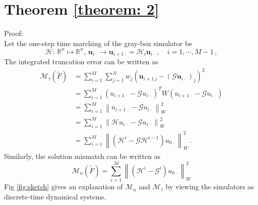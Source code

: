 \section{Theorem \ref{theorem: 2}}
\label{proof 2}
Proof: \\
Let the one-step time marching of the gray-box simulator be
\begin{equation*}
    \mathcal{H}:\, \mathbb{R}^n\mapsto\mathbb{R}^n,\, 
    \boldsymbol{u}_{i\cdot}
    \rightarrow 
    \boldsymbol{u}_{i+1\cdot} = \mathcal{H}_i\boldsymbol{u}_{i\cdot} \,,
    \quad i=1,\cdots, M-1\,,
\end{equation*}
The integrated truncation error can be written as
\begin{equation*}\begin{split}
    \mathcal{M}_{\tau}(\tilde{F}) &= 
        \sum_{i=1}^M \sum_{j=1}^N w_{j} \left(
        \boldsymbol{u}_{i+1\, j} - (\mathcal{G}\boldsymbol{u}_{i\, \cdot})_j
        \right)^2\\
    &= \sum_{i=1}^M (u_{i+1\,\cdot} - \mathcal{G} u_{i\,\cdot})^T W
                    (u_{i+1\,\cdot} - \mathcal{G} u_{i\,\cdot}) \\
    &= \sum_{i=1}^M \left\|u_{i+1\,\cdot} - \mathcal{G} u_{i\,\cdot}\right\|^2_{W}\\
    &= \sum_{i=1}^M \left\| \mathcal{H} u_{i\, \cdot} - \mathcal{G} u_{i\,\cdot} \right\|^2_{W}\\
    &= \sum_{i=1}^M \left\| \left(\mathcal{H}^i - \mathcal{G} \mathcal{H}^{i-1}\right)
       u_{0\,\cdot} \right\|^2_{W}\,.
\end{split}\end{equation*}
Similarly, the solution mismatch can be written as
\begin{equation*}
    \mathcal{M}_u(\tilde{F}) = \sum_{i=1}^M \left\| 
    \left(\mathcal{H}^i - \mathcal{G}^i\right)
    u_{0\,\cdot} \right\|^2_{W}
\end{equation*}
Fig \ref{fig:sketch} gives an explanation of $\mathcal{M}_u$ and $\mathcal{M}_{\tau}$ by viewing 
the simulators as discrete-time dynamical systems.\\

